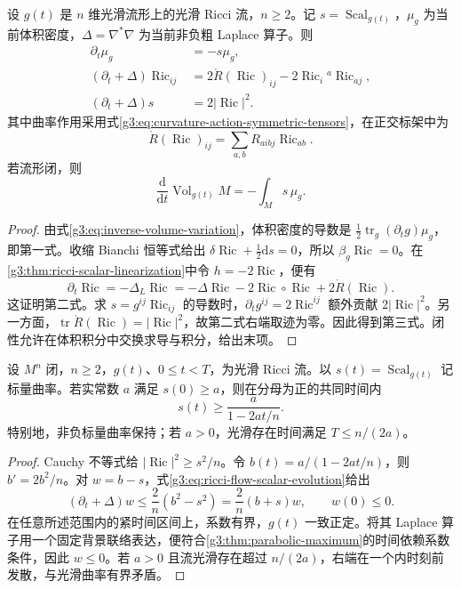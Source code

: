 \begin{proposition}\label{g3:prop:ricci-flow-basic-evolution}
	设 \(g(t)\) 是 \(n\) 维光滑流形上的光滑 Ricci 流，\(n\ge2\)。记 \(s=\operatorname{Scal}_{g(t)}\)，\(\mu_g\) 为当前体积密度，\(\Delta=\nabla^*\nabla\) 为当前非负粗 Laplace 算子。则
	\begin{align}
		\partial_t\mu_g&=-s\mu_g,\label{g3:eq:ricci-flow-volume-evolution}\\
		(\partial_t+\Delta)\operatorname{Ric}_{ij}
		&=2\mathring R(\operatorname{Ric})_{ij}
		-2\operatorname{Ric}_i{}^a\operatorname{Ric}_{aj},\label{g3:eq:ricci-flow-ricci-evolution}\\
		(\partial_t+\Delta)s&=2|\operatorname{Ric}|^2.\label{g3:eq:ricci-flow-scalar-evolution}
	\end{align}
	其中曲率作用采用式\eqref{g3:eq:curvature-action-symmetric-tensors}，在正交标架中为
	\[
		\mathring R(\operatorname{Ric})_{ij}
		=\sum_{a,b}R_{a i b j}\operatorname{Ric}_{ab}.
	\]
	若流形闭，则
	\[
		\frac{\mathrm d}{\mathrm dt}\operatorname{Vol}_{g(t)}M
		=-\int_M s\,\mu_g.
	\]
\end{proposition}
\begin{proof}
	由式\eqref{g3:eq:inverse-volume-variation}，体积密度的导数是 \(\tfrac12\operatorname{tr}_g(\partial_tg)\mu_g\)，即第一式。收缩 Bianchi 恒等式给出 \(\delta\operatorname{Ric}+\tfrac12\mathrm ds=0\)，所以 \(\beta_g\operatorname{Ric}=0\)。在\cref{g3:thm:ricci-scalar-linearization}中令 \(h=-2\operatorname{Ric}\)，便有
	\[
		\partial_t\operatorname{Ric}
		=-\Delta_L\operatorname{Ric}
		=-\Delta\operatorname{Ric}
		-2\operatorname{Ric}\circ\operatorname{Ric}
		+2\mathring R(\operatorname{Ric}).
	\]
	这证明第二式。求 \(s=g^{ij}\operatorname{Ric}_{ij}\) 的导数时，\(\partial_tg^{ij}=2\operatorname{Ric}^{ij}\) 额外贡献 \(2|\operatorname{Ric}|^2\)。另一方面，\(\operatorname{tr}\mathring R(\operatorname{Ric})=|\operatorname{Ric}|^2\)，故第二式右端取迹为零。因此得到第三式。闭性允许在体积积分中交换求导与积分，给出末项。
\end{proof}

\begin{proposition}\label{g3:prop:ricci-flow-scalar-lower-bound}
	设 \(M^n\) 闭，\(n\ge2\)，\(g(t)\)、\(0\le t<T\)，为光滑 Ricci 流。以 \(s(t)=\operatorname{Scal}_{g(t)}\) 记标量曲率。若实常数 \(a\) 满足 \(s(0)\ge a\)，则在分母为正的共同时间内
	\begin{equation}\label{g3:eq:ricci-flow-scalar-lower-bound}
		s(t)\ge\frac{a}{1-2at/n}.
	\end{equation}
	特别地，非负标量曲率保持；若 \(a>0\)，光滑存在时间满足 \(T\le n/(2a)\)。
\end{proposition}
\begin{proof}
	Cauchy 不等式给 \(|\operatorname{Ric}|^2\ge s^2/n\)。令 \(b(t)=a/(1-2at/n)\)，则 \(b'=2b^2/n\)。对 \(w=b-s\)，式\eqref{g3:eq:ricci-flow-scalar-evolution}给出
	\[
		(\partial_t+\Delta)w
		\le\frac2n(b^2-s^2)=\frac2n(b+s)w,
		\qquad w(0)\le0.
	\]
	在任意所述范围内的紧时间区间上，系数有界，\(g(t)\) 一致正定。将其 Laplace 算子用一个固定背景联络表达，便符合\cref{g3:thm:parabolic-maximum}的时间依赖系数条件，因此 \(w\le0\)。若 \(a>0\) 且流光滑存在超过 \(n/(2a)\)，右端在一个内时刻前发散，与光滑曲率有界矛盾。
\end{proof}


